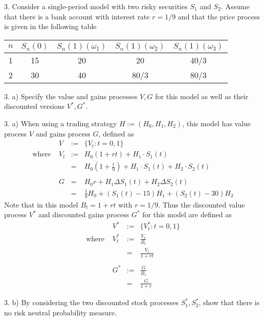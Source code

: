 \documentclass[11pt,a4paper]{article}
\begin{document}
\begin{question}{3.}
  Consider a single-period model with two risky securities $S_1$ and $S_2$. Assume that there is a bank account with interest rate $r=1/9$ and that the price process is given in the following table
  \begin{center}
    \begin{tabular}{c|c|ccc}
      $n$&$S_n(0)$&$S_n(1)(\omega_1)$&$S_n(1)(\omega_2)$&$S_n(1)(\omega_3)$\\\hline
      1&15&20&20&40/3\\
      2&30&40&80/3&80/3
    \end{tabular}
  \end{center}
\end{question}

\begin{question}{3. a)}
  Specify the value and gains processes $V,G$ for this model as well as their discounted versions $V^*,G^*$.
\end{question}

\begin{answer}{3. a)}
  When using a trading strategy $H:=(H_0,H_1,H_2)$, this model has value process $V$ and gains process $G$, defined as
  \[\begin{array}{rrrl}
    &V&:=&\{V_t:t=0,1\}\\
    \text{where }&V_t&:=&H_0(1+rt)+H_1\cdot S_1(t)\\
    &&=&H_0\left(1+\frac{t}9\right)+H_1\cdot S_1(t)+H_2\cdot S_2(t)\\
    \\
    &G&=&H_0r+H_1\Delta S_1(t)+H_2\Delta S_2(t)\\
    &&=&\frac19H_0+(S_1(t)-15)H_1+(S_2(t)-30)H_2
  \end{array}\]
  Note that in this model $B_t=1+rt$ with $r=1/9$. Thus the discounted value process $V^*$ and discounted gains process $G^*$ for this model are defined as
  \[\begin{array}{rrcl}
    &V^*&:=&\{V_t^*:t=0,1\}\\
    \text{where }&V_t^*&:=&\frac{V_t}{B_t}\\
    &&=&\frac{V_t}{1+rt}\\
    \\
    &G^*&:=&\frac{G}{B_1}\\
    &&=&\frac{G}{1+r}
  \end{array}\]
\end{answer}

\begin{question}{3. b)}
  By considering the two discounted stock processes $S_1^*,S_2^*$, show that there is no risk neutral probability measure.
\end{question}
\end{document}
